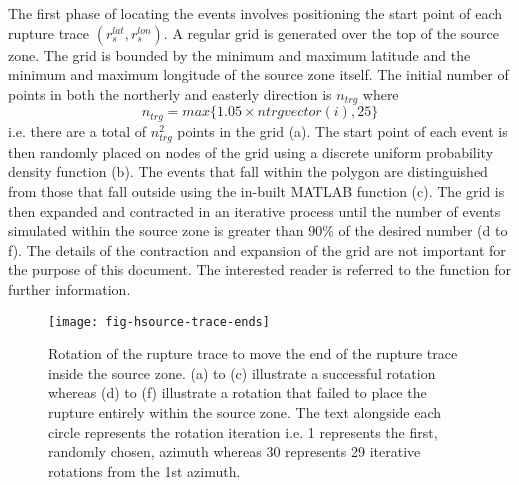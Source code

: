 The first phase of locating the events involves positioning the
start point of each rupture trace $(r_s^{lat},r_s^{lon})$. A
regular grid is generated over the top of the source zone. The
grid is bounded by the minimum and maximum latitude and the
minimum and maximum longitude of the source zone itself. The
initial number of points in both the northerly and easterly
direction is $n_{trg}$ where
\begin{equation}
n_{trg} = max\{1.05\times ntrgvector(i), 25\} \end{equation} i.e.
there are a total of $n_{trg}^2$ points in the grid
(a). The start point of each event
is then randomly placed on nodes of the grid using a discrete
uniform probability density function
(b). The events that fall within the
polygon are distinguished from those that fall outside using the
in-built MATLAB function 
(c). The grid is then expanded and
contracted in an iterative process until the number of events
simulated within the source zone is greater than 90\% of the
desired number (d to f). The details
of the contraction and
 expansion of the grid are not important for the purpose of this
 document. The interested reader is referred to the function
  for further information.


\begin{figure}
\begin{center}
\texttt{[image: fig-hsource-trace-ends]}
\end{center}
\caption{Rotation of the rupture trace to move the end of the
rupture trace inside the source zone. (a) to (c) illustrate a
successful rotation whereas (d) to (f) illustrate a rotation that
failed to place the rupture entirely within the source zone. The
text alongside each circle represents the rotation iteration i.e.
1 represents the first, randomly chosen, azimuth whereas 30
represents 29 iterative rotations from the 1st azimuth.}
\label{fig:source-trace-ends}
\end{figure}

